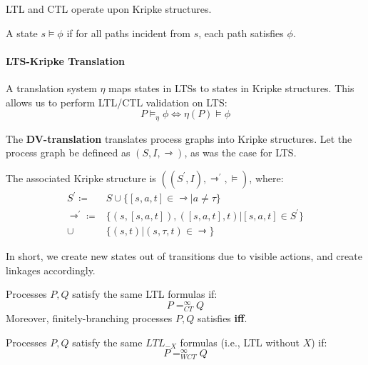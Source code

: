 \documentclass[99-notes-packed.tex]{subfiles}
\begin{document}
LTL and CTL operate upon Kripke structures. 

A state $s \models \phi$ if for all paths incident from $s$, each path satisfies $\phi$.

\paragraph*{LTS-Kripke Translation}
A translation system $\eta$ maps states in LTSs to states in Kripke structures. This allows us to perform LTL/CTL validation on LTS: 
\begin{equation*}
    P \models_{\eta} \phi \iff \eta(P) \models \phi
\end{equation*}

\begin{definition}
    The \textbf{DV-translation} translates process graphs into Kripke structures. Let the process graph be defineed as $(S, I, \rightarrowtriangle)$, as was the case for LTS. 

    The associated Kripke structure is $((S^{'}, I), \rightarrowtriangle^{'}, \models)$, where:
    \begin{align*}
        S^{'} \coloneqq& S \cup \{[s, a, t] \in \rightarrowtriangle | a \ne \tau\} \\
        \rightarrowtriangle^{'} \coloneqq& 
            \{(s, [s, a, t]), ([s, a, t], t) | [s, a, t] \in S^{'}\} \\
            \cup& \{(s, t) | (s, \tau, t) \in \rightarrowtriangle \}
    \end{align*}

    In short, we create new states out of transitions due to visible actions, and create linkages accordingly. 
\end{definition}

\begin{theorem}
    Processes $P, Q$ satisfy the same LTL formulas if: 
    \begin{equation*}
        P =_{CT}^{\infty} Q
    \end{equation*}
    Moreover, finitely-branching processes $P, Q$ satisfies \textbf{iff}.
\end{theorem}

\begin{theorem}
    Processes $P, Q$ satisfy the same $LTL_{-X}$ formulas (i.e., LTL without $X$) if: 
    \begin{equation*}
        P =_{WCT}^{\infty} Q
    \end{equation*}
\end{theorem}
\end{document}
